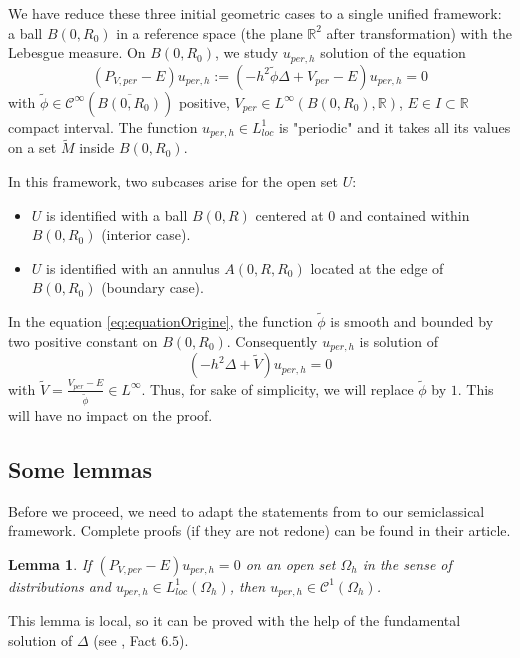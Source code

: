 \documentclass[leqno,11pt,letterpaper, english]{amsart}
\theoremstyle{plain}
\newtheorem{lem}[prop]{Lemma}
\theoremstyle{definition}
\numberwithin{equation}{section}
\def\R{\mathbb R}
\begin{document}
 We have reduce these three initial geometric cases to a single unified framework:
a ball $B(0, R_0)$ in a reference space (the plane $\R^2$ after transformation) with the Lebesgue measure. On $B(0, R_0)$, we study  $u_{per,h}$ solution of the equation
\begin{equation}
	\label{eq:equationOrigine}
	(P_{V,per}-E) u_{per,h} := (-h^2\tilde{\phi}\Delta + V_{per} - E)u_{per,h} = 0
\end{equation}
with $\tilde{\phi} \in \mathcal{C}^\infty(\overline{B(0,R_0)})$ positive, $V_{per}\in L^\infty(B(0,R_0),\R)$, $E\in I \subset \R$ compact interval. The function $u_{per,h} \in L_{loc}^1$ is "periodic" and it takes all its values on a set $\tilde{M}$ inside $B(0,R_0)$.

In this framework, two subcases arise for the open set $U$:
\begin{itemize}
    \item $U$ is identified with a ball $B(0, R)$ centered at $0$ and contained within $B(0, R_0)$ (interior case).
    \item $U$ is identified with an annulus $A(0, R, R_0)$ located at the edge of $B(0, R_0)$ (boundary case).
\end{itemize}

 In the equation \ref{eq:equationOrigine}, the function $\tilde{\phi}$ is smooth and bounded by two positive constant on $B(0,R_0)$. Consequently $u_{per,h}$ is solution of $$(-h^2\Delta + \tilde{V})u_{per,h} = 0$$ with $\tilde{V}=\frac{V_{per}-E}{\tilde{\phi}}\in L^\infty$. Thus, for sake of simplicity, we will replace $\tilde{\phi}$ by $1$. This will have no impact on the proof.
\subsection{Some lemmas}
\label{subsect: preliminaires}
Before we proceed, we need to adapt the statements from \cite{logunov2020landisconjectureexponentialdecay} to our semiclassical framework. Complete proofs (if they are not redone) can be found in their article.

\begin{lem}
\label{lem: C1_regularity_solution_Schrodinger}
If $(P_{V,per} -E)u_{per,h} = 0$ on an open set $\Omega_h$ in the sense of distributions and $u_{per,h} \in L_{loc}^1(\Omega_h)$, then $u_{per,h} \in \mathcal{C}^1(\Omega_h)$.
\end{lem}
This lemma is local, so it can be proved with the help of the fundamental solution of $\Delta$ (see \cite{logunov2020landisconjectureexponentialdecay}, Fact $6.5$).
\end{document}

